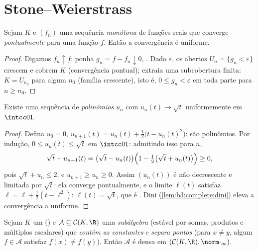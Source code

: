 \section{Stone--Weierstrass}

\begin{lemma}[Dini]\label{lem:b3:complete:dini}
Sejam $K$  e $(f_n)$ uma sequência \emph{monótona} de
funções reais  que converge \emph{pontualmente} para uma
função  $f$. Então a convergência é uniforme.
\end{lemma}

\begin{proof}
Digamos $f_n \uparrow f$; ponha $g_n = f - f_n \downarrow 0$, . Dado $\varepsilon$, os abertos $U_n = \{g_n <
\varepsilon\}$
crescem e cobrem $K$ (convergência pontual); extraia uma
subcobertura finita: $K = U_{n_0}$ para algum $n_0$ (família crescente),
isto é, $0 \leq g_n < \varepsilon$ em toda parte para $n \geq n_0$.
\end{proof}

\begin{lemma}\label{lem:b3:complete:sqrt}
Existe uma sequência de \emph{polinômios} $u_n$ com $u_n(t) \to
\sqrt t$
uniformemente em $\intcc01$.
\end{lemma}

\begin{proof}
Defina $u_0 = 0$, $u_{n+1}(t) = u_n(t) + \frac12\bigl(t -
u_n(t)^2\bigr)$: são polinômios. Por indução, $0 \leq u_n(t) \leq
\sqrt t$ em $\intcc01$:
admitindo isso para $n$,
\[
\sqrt t - u_{n+1}(t) = \bigl(\sqrt t - u_n(t)\bigr)
\Bigl(1 - \tfrac12\bigl(\sqrt t + u_n(t)\bigr)\Bigr) \geq 0,
\]
pois $\sqrt t + u_n \leq 2$; e $u_{n+1} \geq u_n \geq 0$. Assim $(u_n(t))$ é não decrescente e limitada por $\sqrt t$:
ela converge pontualmente, e o limite $\ell(t)$ satisfaz $\ell =
\ell + \frac12(t - \ell^2)$: $\ell(t) = \sqrt t$, que é
. Dini (\cref{lem:b3:complete:dini}) eleva a convergência a uniforme.
\end{proof}

\begin{theorem}
\label{thm:b3:complete:stoneweierstrass}
Sejam $K$ um  () e $\mathcal A \subseteq
\mathcal C(K, \R)$ uma
\emph{subálgebra} (estável por somas, produtos e múltiplos escalares)
que \emph{contém as constantes} e \emph{separa pontos} (para $x \neq y$,
algum $f \in
\mathcal A$ satisfaz $f(x) \neq f(y)$). Então $\mathcal A$ é densa em
$(\mathcal C(K,\R), \norm\cdot_\infty)$.
\end{theorem}

